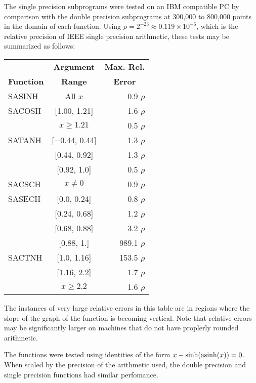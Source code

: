 \documentclass[twoside]{MATH77}
\begin{document}
The single precision subprograms were tested on an IBM compatible PC
by comparison with the double precision subprograms at 300,000 to
800,000 points in the domain of each function.
Using $\rho = 2^{-23} \approx 0.119 \times 10^{-6}$, which is the relative
precision of IEEE single precision arithmetic, these tests may be
summarized as follows:
\begin{center}
\begin{tabular}{lcr}
& \multicolumn{1}{c}{\bf Argument} & \multicolumn{1}{c}{\bf Max. Rel.}\\
\multicolumn{1}{c}{\bf Function} & \multicolumn{1}{c}{\bf Range} &
\multicolumn{1}{c}{\bf Error}\\
SASINH & All $x$ & 0.9 $\rho $\rule[-7pt]{0pt}{8pt}\phantom{~el.}\\
SACOSH & [1.00, 1.21] & 1.6 $\rho $\phantom{~el.}\\
 & $x \geq 1.21$ & 0.5 $\rho $\rule[-7pt]{0pt}{8pt}\phantom{~el.}\\
SATANH & [$-$0.44, 0.44] & 1.3 $\rho $\phantom{~el.}\\
 & [0.44, 0.92] & 1.3 $\rho $\phantom{~el.}\\
 & [0.92, 1.0] & 0.5 $\rho $\rule[-7pt]{0pt}{8pt}\phantom{~el.}\\
SACSCH & $x \neq 0$  & 0.9 $\rho $\rule[-7pt]{0pt}{8pt}\phantom{~el.}\\
SASECH & [0.0, 0.24]  & 0.8 $\rho $\phantom{~el.}\\
 & [0.24, 0.68] & 1.2 $\rho $\phantom{~el.}\\
 & [0.68, 0.88] & 3.2 $\rho $\phantom{~el.}\\
 & [0.88, 1.] & 989.1 $\rho $\rule[-7pt]{0pt}{8pt}\phantom{~el.}\\
SACTNH & [1.0, 1.16] & 153.5 $\rho $\phantom{~el.}\\
 & [1.16, 2.2] & 1.7 $\rho $\phantom{~el.}\\
 & $x \geq 2.2$ & 1.6 $\rho $\phantom{~el.}
\end{tabular}
\end{center}
The instances of very large relative errors in this table are in regions
where the slope of the graph of the function is becoming vertical.
Note that relative errors may be significantly larger on machines
that do not have proplerly rounded arithmetic.

The functions were tested using identities of the form $x - \sinh(\asinh(x)) =
0$.  When scaled by the precision of the arithmetic used, the double precision
and single precision functions had similar perfomance.
\end{document}
